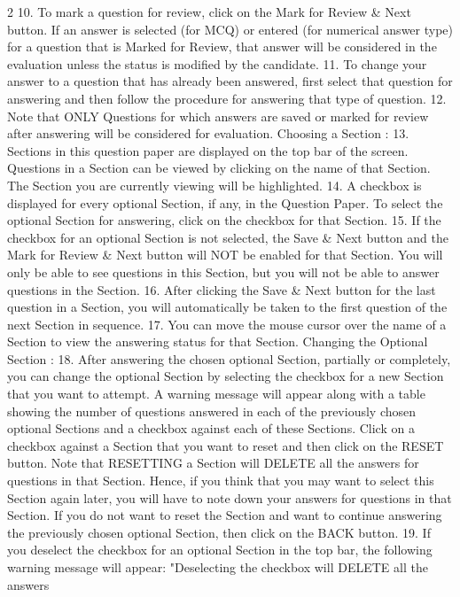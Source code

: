 \documentclass[a4paper,10pt,twoside]{article}
\begin{document}
\begin{multicols}{2}
{10. To mark a question for review, click on the Mark for Review \& Next button. If an
answer is selected (for MCQ) or entered (for numerical answer type) for a question
that is Marked for Review, that answer will be considered in the evaluation unless
the status is modified by the candidate.
11. To change your answer to a question that has already been answered, first select
that question for answering and then follow the procedure for answering that type of
question.
12. Note that ONLY Questions for which answers are saved or marked for review after
answering will be considered for evaluation.
Choosing a Section :
13. Sections in this question paper are displayed on the top bar of the screen. Questions
in a Section can be viewed by clicking on the name of that Section. The Section you
are currently viewing will be highlighted.
14. A checkbox is displayed for every optional Section, if any, in the Question Paper. To
select the optional Section for answering, click on the checkbox for that Section.
15. If the checkbox for an optional Section is not selected, the Save \& Next button and
the Mark for Review \& Next button will NOT be enabled for that Section. You will
only be able to see questions in this Section, but you will not be able to answer
questions in the Section.
16. After clicking the Save \& Next button for the last question in a Section, you will
automatically be taken to the first question of the next Section in sequence.
17. You can move the mouse cursor over the name of a Section to view the answering
status for that Section.
Changing the Optional Section :
18. After answering the chosen optional Section, partially or completely, you can change
the optional Section by selecting the checkbox for a new Section that you want to
attempt. A warning message will appear along with a table showing the number of
questions answered in each of the previously chosen optional Sections and a
checkbox against each of these Sections. Click on a checkbox against a Section that
you want to reset and then click on the RESET button. Note that RESETTING a Section
will DELETE all the answers for questions in that Section. Hence, if you think that you
may want to select this Section again later, you will have to note down your answers
for questions in that Section. If you do not want to reset the Section and want to
continue answering the previously chosen optional Section, then click on the BACK
button.
19. If you deselect the checkbox for an optional Section in the top bar, the following
warning message will appear: "Deselecting the checkbox will DELETE all the answers
}
\end{multicols}
\end{document}
